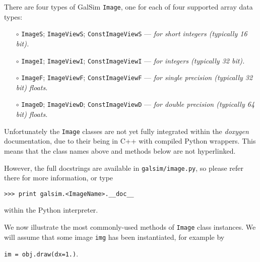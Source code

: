 \documentclass[preprint,11pt]{aastex}
\begin{document}
There are four types of GalSim \texttt{Image},  one for each of four
supported array data types:
\begin{itemize}

\item[$\circ$] \texttt{ImageS}; \texttt{ImageViewS};
  \texttt{ConstImageViewS} --- \emph{for short integers (typically 16 bit).}

\item[$\circ$] \texttt{ImageI}; \texttt{ImageViewI};
  \texttt{ConstImageViewI} --- \emph{for integers (typically 32 bit).}

\item[$\circ$] \texttt{ImageF}; \texttt{ImageViewF};
  \texttt{ConstImageViewF} --- \emph{for single precision (typically 32 bit)
  floats.}

\item[$\circ$] \texttt{ImageD}; \texttt{ImageViewD};
  \texttt{ConstImageViewD} --- \emph{for double precision (typically 64 bit)
  floats.}

\end{itemize}
Unfortunately the \texttt{Image} classes are not yet fully integrated within
the \emph{doxygen} documentation, due to their being in C++ with compiled
Python wrappers.  This means that the class names above and methods below are not
hyperlinked.

However, the full docstrings are available in
\texttt{galsim/image.py}, so please refer there for more information,
or type

{\tt >>> print galsim.<ImageName>.\_\_doc\_\_}

within the Python interpreter.

We now illustrate the most commonly-used methods of \texttt{Image}
class instances.
We will assume that some image \texttt{img} 
has been instantiated, for example by

{\tt im = obj.draw(dx=1.)}.
\end{document}
